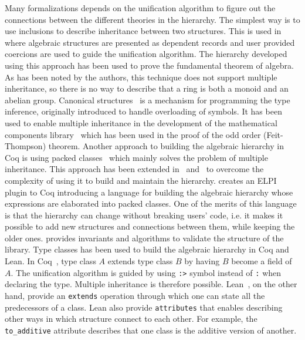 Many formalizations depends on the unification algorithm to figure out the connections between the different theories in the hierarchy. 
The simplest way is to use inclusions to describe inheritance between two structures. This is used in~\cite{Geuvers2002} where algebraic structures are presented as dependent records and user provided coercions are used to guide the unification algorithm. The hierarchy developed using this approach has been used to prove the fundamental theorem of algebra. As has been noted by the authors, this technique does not support multiple inheritance, so there is no way to describe that a ring is both a monoid and an abelian group. 
Canonical structures~\cite{canonical2013} is a mechanism for programming the type inference, originally introduced to handle overloading of symbols. It has been used to enable multiple inheritance in the development of the mathematical components library~\cite{mathCompBook2020} which has been used in the proof of the odd order (Feit-Thompson) theorem. 
Another approach to building the algebraic hierarchy in Coq is using packed classes~\cite{Gonthier2009} which mainly solves the problem of multiple inheritance. This approach has been extended in~\cite{cohen2020hierarchy} and~\cite{sakaguchi2020validating} to overcome the complexity of using it to build and maintain the hierarchy. \cite{cohen2020hierarchy} creates an ELPI~\cite{elpi,elpiForCoq} plugin to Coq introducing a language for building the algebraic hierarchy whose expressions are elaborated into packed classes. One of the merits of this language is that the hierarchy can change without breaking users' code, i.e. it makes it possible to add new structures and connections between them, while keeping the older ones. \cite{sakaguchi2020validating} provides invariants and algorithms to validate the structure of the library.  
Type classes has been used to build the algebraic hierarchy in Coq and Lean. In Coq~\cite{spitters2011type}, type class $A$ extends type class $B$ by having $B$ become a field of $A$. The unification algorithm is guided by using \verb|:>| symbol instead of \verb|:| when declaring the type. Multiple inheritance is therefore possible. Lean~\cite{lean2019}, on the other hand, provide an \verb|extends| operation through which one can state all the predecessors of a class. Lean also provide \verb|attributes| that enables describing other ways in which structure connect to each other. For example, the \verb|to_additive| attribute describes that one class is the additive version of another.

